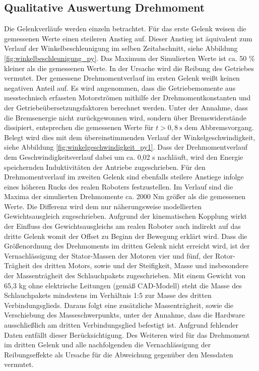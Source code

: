 \subsection{Qualitative Auswertung Drehmoment}
Die Gelenkverläufe werden einzeln betrachtet. Für das erste Gelenk weisen die gemessenen Werte einen steileren Anstieg auf. Dieser Anstieg ist äquivalent zum Verlauf der Winkelbeschleunigung im selben Zeitabschnitt, siehe Abbildung \ref{fig:winkelbeschleunigung_py}. Das Maximum der Simulierten Werte ist ca. 50 \% kleiner als die gemessenen Werte. In der Ursache wird die Reibung des Getriebes vermutet. Der gemessene Drehmomentverlauf im ersten Gelenk weißt keinen negativen Anteil auf. Es wird angenommen, dass die Getriebemomente aus messtechnisch erfassten Motorströmen mithilfe der Drehmomentkonstanten und der Getriebeübersetzungsfaktoren berechnet werden. Unter der Annahme, dass die Bremsenergie nicht zurückgewonnen wird, sondern über Bremswiderstände dissipiert, entsprechen die gemessenen Werte für $t>0,8~\text{s}$ dem  Abbremsvorgang. Belegt wird dies mit dem übereinstimmenden Verlauf der Winkelgeschwindigkeit, siehe Abbildung \ref{fig:winkelgeschwindigkeit_py1}. Dass der Drehmomentverlauf dem Geschwindigkeitsverlauf dabei um ca. 0,02 s nachläuft, wird den Energie speichernden Induktivitäten der Antriebe zugeschrieben. Für den Drehmomentverlauf im zweiten Gelenk sind ebenfalls steilere Anstiege infolge eines höheren Rucks des realen Roboters festzustellen. Im Verlauf sind die Maxima der simulierten Drehmomente  ca. 2000 Nm größer als die gemessenen Werte. Die Differenz wird dem nur näherungsweise modellierten Gewichtsausgleich zugeschrieben. Aufgrund der kinematischen Kopplung wirkt der Einfluss des Gewichtsausgleichs am realen Roboter auch indirekt auf das dritte Gelenk womit der Offset zu Beginn der Bewegung erklärt wird. Dass die Größenordnung des Drehmoments im dritten Gelenk nicht erreicht wird, ist der Vernachlässigung der Stator-Massen der Motoren vier und fünf, der Rotor-Trägheit des dritten Motors, sowie und der Steifigkeit, Masse und insbesondere der Massenträgheit des Schlauchpakets zugeschrieben. Mit einem Gewicht von 65,3 kg  ohne elektrische Leitungen (gemäß CAD-Modell) steht die Masse des Schlauchpakets mindestens im Verhältnis 1:5 zur Masse des dritten Verbindungsglieds. Daraus folgt eine zusätzliche Massenträgheit, sowie die Verschiebung des Masseschwerpunkts, unter der Annahme, dass die Hardware ausschließlich am dritten Verbindungsglied befestigt ist. Aufgrund fehlender Daten entfällt dieser Berücksichtigung. Des Weiteren wird für das Drehmoment im dritten Gelenk und alle nachfolgenden die Vernachlässigung  der Reibungseffekte als Ursache für die Abweichung gegenüber den Messdaten vermutet. 
%
